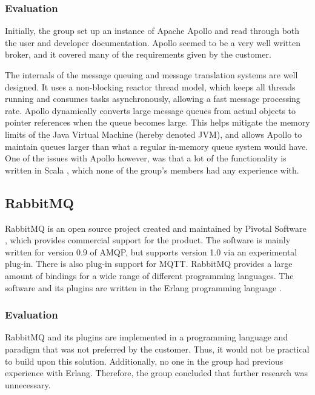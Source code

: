 \subsubsection{Evaluation}
\label{subsec:prestudies-existing_solutions-apache_apollo-evaluation}

Initially, the group set up an instance of Apache Apollo and read through both the user and developer documentation. Apollo seemed to be a very well written broker, and it covered many of the requirements given by the customer.

The internals of the message queuing and message translation systems are well designed. It uses a non-blocking reactor thread model, which keeps all threads running and consumes tasks asynchronously, allowing a fast message processing rate. Apollo dynamically converts large message queues from actual objects to pointer references when the queue becomes large. This helps mitigate the memory limits of the Java Virtual Machine (hereby denoted JVM), and allows Apollo to maintain queues larger than what a regular in-memory queue system would have. One of the issues with Apollo however, was that a lot of the functionality is written in Scala  \cite{scala}, which none of the group's members had any experience with.

\subsection{RabbitMQ}
\label{subsec:prestudies-existing_solutions-rabbitmq}

RabbitMQ \cite{rabbit-mq} is an open source project created and maintained by Pivotal Software \cite{pivotal-software}, which provides commercial support for the product. The software is mainly written for version 0.9 of AMQP, but supports version 1.0 via an experimental plug-in. There is also plug-in support for MQTT. RabbitMQ provides a large amount of bindings for a wide range of different programming languages. The software and its plugins are written in the Erlang programming language \cite{erlang}.

\subsubsection{Evaluation}
\label{subsec:prestudies-existing_solutions-rabbitmq-evaluation}

RabbitMQ and its plugins are implemented in a programming language and paradigm that was not preferred by the customer. Thus, it would not be practical to build upon this solution. Additionally, no one in the group had previous experience with Erlang. Therefore, the group concluded that further research was unnecessary.

